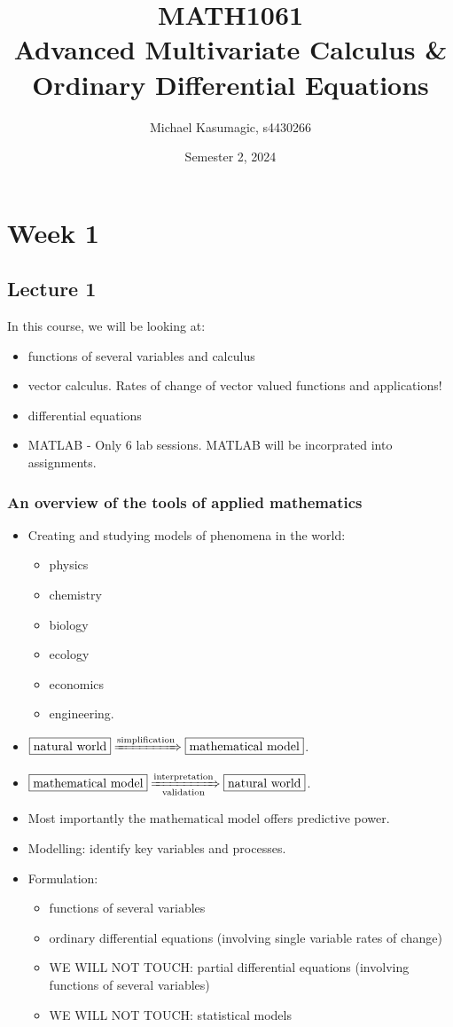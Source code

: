 \documentclass{report}
\title{\Huge{MATH1061}\\Advanced Multivariate Calculus \& Ordinary Differential Equations}
\author{\huge{Michael Kasumagic, s4430266}}
\date{\huge{Semester 2, 2024}}
\begin{document}
\maketitle
\newpage%
\tableofcontents
\pagebreak

\chapter{Week 1}
\section{Lecture 1}
In this course, we will be looking at:
\begin{itemize}
	\item functions of several variables and calculus
	\item vector calculus. Rates of change of vector valued functions and applications!
	\item differential equations
	\item MATLAB - Only 6 lab sessions. MATLAB will be incorprated into assignments.
\end{itemize}

\subsection*{An overview of the tools of applied mathematics}
\begin{itemize}
	\item Creating and studying models of phenomena in the world:
	\begin{itemize}
		\item physics
		\item chemistry
		\item biology
		\item ecology
		\item economics
		\item engineering.
	\end{itemize}
	\item $\boxed{\text{natural world}} \xRightarrow{\text{simplification}} \boxed{\text{mathematical model}}$.
	\item $\boxed{\text{mathematical model}} \xRightarrow[\text{validation}]{\text{interpretation}} \boxed{\text{natural world}}$.
	\item Most importantly the $\boxed{\text{mathematical model}}$ offers predictive power.
	\item Modelling: identify key variables and processes.
	\item Formulation:
	\begin{itemize}
		\item functions of several variables
		\item ordinary differential equations (involving single variable rates of change)
		\item WE WILL NOT TOUCH: partial differential equations (involving functions of several variables)
		\item WE WILL NOT TOUCH: statistical models
	\end{itemize}
\end{itemize}
\end{document}
